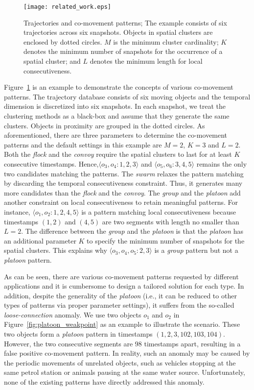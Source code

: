 \begin{figure}[h]
\centering
\texttt{[image: related\_work.eps]}
\caption{Trajectories and co-movement patterns; The example consists of six trajectories across six snapshots. Objects in spatial clusters are enclosed by dotted circles. $M$ is the minimum cluster cardinality; $K$ denotes the minimum number of snapshots for the occurrence of a spatial cluster; and $L$ denotes the minimum length for local consecutiveness.}
\label{fig:related_work}
\end{figure}

Figure~\ref{fig:related_work} is an example to demonstrate the concepts of various co-movement patterns. The trajectory database consists of six moving objects and the temporal dimension is discretized into six snapshots. In each snapshot, we treat the clustering methods as a black-box and assume that they generate the same clusters. Objects in proximity are grouped in the dotted circles. As aforementioned, there are three parameters to determine the co-movement patterns and the default settings in this example are $M=2$, $K=3$ and $L=2$. Both the \emph{flock} and the \emph{convoy} require the spatial clusters to last for at least $K$ consecutive  timestamps. Hence,$\langle o_3,o_4:1,2,3 \rangle$ and $\langle o_5,o_6:3,4,5 \rangle$  remains the only two candidates matching the patterns. The \textit{swarm} relaxes the pattern matching by discarding the temporal consecutiveness constraint. Thus, it generates many more candidates than the \textit{flock} and the \textit{convoy}. The \textit{group} and the \textit{platoon} add another constraint on local consecutiveness to retain meaningful patterns. For instance, $\langle o_1,o_2:1,2,4,5 \rangle$ is a pattern matching local consecutiveness because timestamps $(1,2)$ and $(4,5)$ are two segments with length no smaller than $L=2$. The difference between the \textit{group} and the \textit{platoon} is that the \textit{platoon} has an additional parameter $K$ to specify the minimum number of snapshots for the spatial clusters. This explains why $\langle o_3,o_4,o_5:2,3 \rangle$ is a  \textit{group} pattern but not a \textit{platoon} pattern.

As can be seen, there are various co-movement patterns requested by different applications and it is cumbersome to design a tailored solution for each type. In addition, despite the generality of the \emph{platoon} (i.e., it can be reduced to other types of patterns via proper parameter settings), it suffers from the so-called \emph{loose-connection} anomaly. We use two objects $o_1$ and $o_2$ in Figure~\ref{fig:platoon_weakpoint} as an example to illustrate the scenario. These two objects form a \emph{platoon} pattern in timestamps $(1,2,3,102,103,104)$. However, the two consecutive segments are $98$ timestamps apart, resulting in a false positive co-movement pattern. In reality, such an anomaly may be caused  by the periodic movements of unrelated objects, such as vehicles stopping at the same petrol station or animals pausing at the same water source. 
Unfortunately, none of the existing patterns have directly addressed this anomaly.


